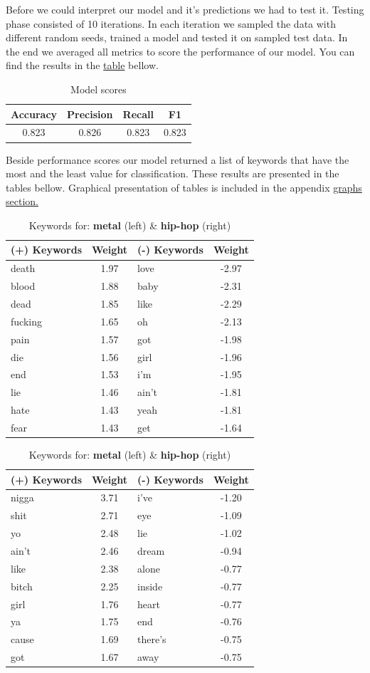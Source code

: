 \documentclass[a4paper,11pt]{article}
\begin{document}
Before we could interpret our model and it's predictions we had to test it. Testing phase consisted of 10 iterations. In each iteration we sampled the data with different random seeds, trained a model and tested it on sampled test data. In the end we averaged all metrics to score the performance of our model. You can find the results in the \hyperref[label-model-score]{table} bellow.

\begin{table}[h!]
\centering
\label{baseline}
\begin{tabular}{|c|c|c|c|}
\hline
Accuracy & Precision & Recall & F1 \\
\hline
0.823 & 0.826 & 0.823 & 0.823 \\
\hline
\end{tabular}
\label{label-model-score}
\caption{Model scores}
\end{table}

\noindent Beside performance scores our model returned a list of keywords that have the most and the least value for classification. These results are presented in the tables bellow. Graphical presentation of tables is included in the appendix \hyperref[label-graphs]{graphs section.}

\begin{table}[h!]
\begin{tabular}{|lc|lc|}
\hline
(+) Keywords & Weight & (-) Keywords & Weight \\
\hline
death & 1.97 & love & -2.97 \\
blood & 1.88 & baby & -2.31 \\
dead & 1.85 & like & -2.29 \\
fucking & 1.65 & oh & -2.13 \\
pain & 1.57 & got & -1.98 \\
die & 1.56 & girl & -1.96 \\
end & 1.53 & i'm & -1.95 \\
lie & 1.46 & ain't & -1.81 \\
hate & 1.43 & yeah & -1.81 \\
fear & 1.43 & get & -1.64 \\
\hline
\end{tabular}
\quad
\begin{tabular}{|lc|lc|}
\hline
(+) Keywords & Weight & (-) Keywords & Weight \\
\hline
nigga & 3.71 & i've & -1.20 \\
shit & 2.71 & eye & -1.09 \\
yo & 2.48 & lie & -1.02 \\
ain't & 2.46 & dream & -0.94 \\
like & 2.38 & alone & -0.77 \\
bitch & 2.25 & inside & -0.77 \\
girl & 1.76 & heart & -0.77 \\
ya & 1.75 & end & -0.76 \\
cause & 1.69 & there's & -0.75 \\
got & 1.67 & away & -0.75 \\
\hline
\end{tabular}
\caption{Keywords for: \textbf{metal} (left) \& \textbf{hip-hop} (right)}
\end{table}
\end{document}
